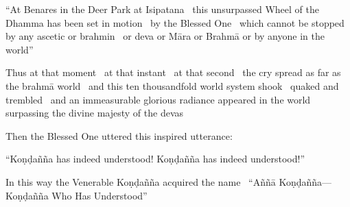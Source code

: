 \begin{english-only-hang}
  ``At Benares in the Deer Park at Isipatana \breathmark\ this unsurpassed Wheel of the Dhamma has been set in motion \breathmark\ by the Blessed One \breathmark\ which cannot be stopped by any ascetic or brahmin \breathmark\ or deva or Māra or Brahmā or by anyone in the world''
\end{english-only-hang}

\begin{english-only-hang}
  Thus at that moment \breathmark\ at that instant \breathmark\ at that second \breathmark\ the cry spread as far as the brahmā world \breathmark\ and this ten thousandfold world system shook \breathmark\ quaked and trembled \breathmark\ and an immeasurable glorious radiance appeared in the world surpassing the divine majesty of the devas
\end{english-only-hang}

\begin{english-only-hang}
  Then the Blessed One uttered this inspired utterance:
\end{english-only-hang}

\begin{english-only-hang}
  ``Koṇḍañña has indeed understood! Koṇḍañña has indeed understood!''
\end{english-only-hang}

\begin{english-only-hang}
  In this way the Venerable Koṇḍañña acquired the name \breathmark\ ``Aññā Koṇḍañña—Koṇḍañña Who Has Understood''
\end{english-only-hang}

\suttaRef{[SN 56.11]}

